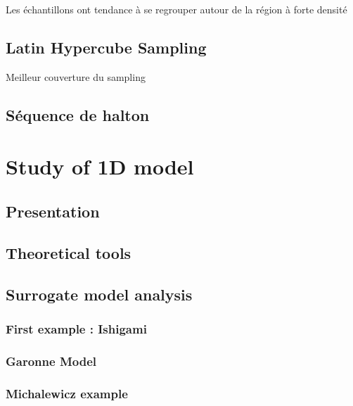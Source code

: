 \documentclass[hidelinks,12pt]{article}
\begin{document}
Les échantillons ont tendance à se regrouper autour de la région à forte densité


\subsection{Latin Hypercube Sampling}

Meilleur couverture du sampling

\subsection{Séquence de halton}




\section{Study of 1D model}
\subsection{Presentation}
\subsection{Theoretical tools}
\subsection{Surrogate model analysis}
\subsubsection{First example : Ishigami}
\subsubsection{Garonne Model }



\subsubsection{Michalewicz example}






\end{document}
